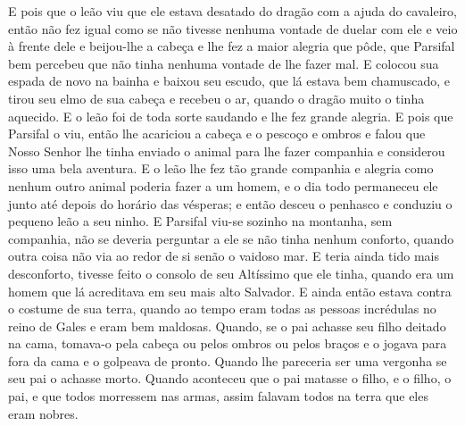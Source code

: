 E pois que o leão viu que ele estava desatado do dragão com a ajuda do
cavaleiro, então não fez igual como se não tivesse nenhuma vontade de duelar
com ele e veio à frente dele e beijou-lhe a cabeça e lhe fez a maior alegria
que pôde, que Parsifal bem percebeu que não tinha nenhuma vontade de lhe fazer
mal. E colocou sua espada de novo na bainha e baixou seu escudo, que lá estava
bem chamuscado, e tirou seu elmo de sua cabeça e recebeu o ar, quando o dragão
muito o tinha aquecido. E o leão foi de toda sorte saudando e lhe fez grande
alegria. E pois que Parsifal o viu, então lhe acariciou a cabeça e o pescoço e
ombros e falou que Nosso Senhor lhe tinha enviado o animal para lhe fazer
companhia e considerou isso uma bela aventura. E o leão lhe fez tão grande
companhia e alegria como nenhum outro animal poderia fazer a um homem, e o dia
todo permaneceu ele junto até depois do horário das vésperas; e então desceu o
penhasco e conduziu o pequeno leão a seu ninho. E Parsifal viu-se sozinho na
montanha, sem companhia, não se deveria perguntar a ele se não tinha nenhum
conforto, quando outra coisa não via ao redor de si senão o vaidoso mar. E
teria ainda tido mais desconforto, tivesse feito o consolo de seu Altíssimo que
ele tinha, quando era um homem que lá acreditava em seu mais alto Salvador. E
ainda então estava contra o costume de sua terra, quando ao tempo eram todas as
pessoas incrédulas no reino de Gales e eram bem maldosas. Quando, se o pai
achasse seu filho deitado na cama, tomava-o pela cabeça ou pelos ombros ou
pelos braços e o jogava para fora da cama e o golpeava de pronto. Quando lhe
pareceria ser uma vergonha se seu pai o achasse morto. Quando aconteceu que o
pai matasse o filho, e o filho, o pai, e que todos morressem nas armas, assim
falavam todos na terra que eles eram nobres. 

